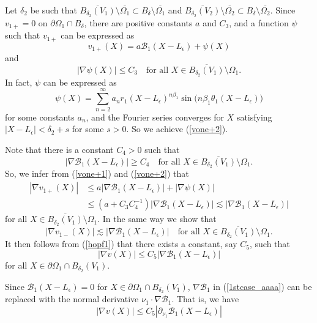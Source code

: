 \documentclass[11pt,a4paper]{article}
\numberwithin{equation}{section}
\newcommand{\p}{\partial}
\newcommand{\eqnref}[1]{(\ref {#1})}
\newcommand{\Bcal}{\mathcal{B}}
\newcommand{\Gb}{\beta}
\newcommand{\Gd}{\delta}
\newcommand{\Ge}{\epsilon}
\newcommand{\Gt}{\theta}
\newcommand{\GO}{\Omega}
\newcommand{\beq}{\begin{equation}}
\newcommand{\eeq}{\end{equation}}
\newcommand{\ol}{\overline}
\begin{document}
Let $\Gd_2$ be such that $\ol{B_{\Gd_2}(V_1)} \setminus \ol{\GO_1} \subset B_{\Gd} \setminus \overline{\GO_1}$ and $\ol{B_{\Gd_2}(V_2)} \setminus \ol{\GO_2} \subset B_{\Gd} \setminus \overline{\GO_2}$.
Since $v_{1+}= 0$ on $\p\GO_1 \cap B_{\Gd}$, there are positive constants $a$ and $C_3$, and a function $\psi$ such that $v_{1+}$ can be expressed as
\beq\label{vone+1}
v_{1+}(X) = a \Bcal_1(X-L_\Ge) + \psi(X)
\eeq
and
\beq\label{vone+2}
|\nabla \psi(X)| \le C_3 \quad\mbox{for all } X \in \ol{B_{\Gd_2}(V_1)} \setminus \GO_1.
\eeq
In fact, $\psi$ can be expressed as
$$
\psi(X)= \sum_{n=2}^\infty a_n r_1(X-L_\Ge)^{n\Gb_1} \sin\big( n\Gb_1 \Gt_1(X-L_\Ge))
$$
for some constants $a_n$, and the Fourier series converges for $X$ satisfying $|X-L_\Ge| < \Gd_2+s$ for some $s>0$. So we achieve \eqnref{vone+2}.


Note that there is a constant $C_4>0$ such that
$$
| \nabla \Bcal_1(X-L_\Ge)| \ge C_4 \quad\mbox{for all } X \in \ol{B_{\Gd_2}(V_1)} \setminus \GO_1.
$$
So, we infer from \eqnref{vone+1} and \eqnref{vone+2} that
\begin{align*}
|\nabla v_{1+}(X)| &\le a |\nabla \Bcal_1(X-L_\Ge)| + |\nabla \psi(X)| \\
&\le (a+ C_3 C_4^{-1}) |\nabla \Bcal_1(X-L_\Ge)| \lesssim | \nabla \Bcal_1(X-L_\Ge)|
\end{align*}
for all $X \in \ol{B_{\Gd_2}(V_1)} \setminus \GO_1$.
In the same way we show that
$$
|\nabla v_{1-}(X)| \lesssim | \nabla \Bcal_1(X-L_\Ge)| \quad\mbox{for all } X \in \ol{B_{\Gd_2}(V_1)} \setminus \GO_1.
$$
It then follows from \eqnref{hopf1} that there exists a constant, say $C_5$, such that
\beq\label{1stcase_aaaa}
|\nabla  v (X)| \leq C_5 \left| \nabla \Bcal_1\left ( X-L_\Ge \right)\right |
\eeq
for all $X \in \p { \GO_1} \cap B_{\Gd_2} (V_1)$.


Since $\Bcal_1\left ( X-L_\Ge \right)=0$ for $X \in \p { \GO_1} \cap B_{\Gd_2} (V_1)$, $\nabla \Bcal_1$ in \eqnref{1stcase_aaaa} can be replaced with the normal derivative $\nu_1 \cdot \nabla \Bcal_1$. That is, we have 
\beq\label{1stcase_aaaa2}
|\nabla  v (X)| \leq C_5 \left| \p_{\nu_1} \Bcal_1\left ( X-L_\Ge \right)\right |
\eeq
\end{document}
